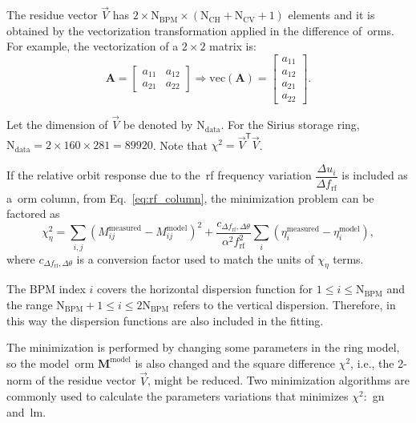 The residue vector $\vec{V}$ has $2 \times \mathrm{N}_{\mathrm{BPM}} \times \left(\mathrm{N}_{\mathrm{CH}} + \mathrm{N}_{\mathrm{CV}}+1\right)$ elements and it is obtained by the vectorization transformation applied in the difference of~\gls{orm}s. For example, the vectorization of a $2 \times 2$ matrix is:
\begin{equation}
        \mathbf{A} = \begin{bmatrix}
     a_{11} & a_{12} \\
     a_{21} & a_{22} 
\end{bmatrix} \Rightarrow \mathrm{vec}\left(\mathbf{A}\right) = \begin{bmatrix}
     a_{11}  \\
     a_{12} \\
     a_{21} \\ 
     a_{22} 
\end{bmatrix}.
\end{equation}

Let the dimension of $\vec{V}$ be denoted by $\mathrm{N}_{\mathrm{data}}$. For the Sirius storage ring, $\mathrm{N}_{\mathrm{data}} = 2 \times 160 \times 281 = 89920$. Note that $\chi^2 = \vec{V}^{\mathsf{T}}\vec{V}$.

If the relative orbit response due to the~\gls{rf} frequency variation $\dfrac{\Delta u_i}{\Delta f_{\mathrm{rf}}}$ is included as a~\gls{orm} column, from Eq.~\eqref{eq:rf_column}, the minimization problem can be factored as
\begin{equation}
    \chi^2_{\eta} = \sum_{i, j} \left(M^{\mathrm{measured}}_{ij} - M^{\mathrm{model}}_{ij}\right)^2 + \dfrac{c_{\Delta f_{\mathrm{rf}}, \Delta \theta}}{\alpha^2 f_{\mathrm{rf}}^2}\sum_{i}\left(\eta^{\mathrm{measured}}_{i} - \eta^{\mathrm{model}}_{i}\right),
    \label{eq:chi2_disp}
\end{equation}
where $c_{\Delta f_{\mathrm{rf}}, \Delta \theta}$ is a conversion factor used to match the units of $\chi_{\eta}$ terms. 

The BPM index $i$ covers the horizontal dispersion function for $1 \leq i \leq \mathrm{N}_{\mathrm{BPM}}$ and the range $\mathrm{N}_{\mathrm{BPM}}+1 \leq i \leq 2\mathrm{N}_{\mathrm{BPM}}$ refers to the vertical dispersion. Therefore, in this way the dispersion functions are also included in the fitting.

The minimization is performed by changing some parameters in the ring model, so the model~\gls{orm} $\mathbf{M}^{\mathrm{model}}$ is also changed and the square difference $\chi^2$, i.e., the 2-norm of the residue vector $\vec{V}$, might be reduced. Two minimization algorithms are commonly used to calculate the parameters variations that minimizes $\chi^2$:~\gls{gn} and~\gls{lm}.

